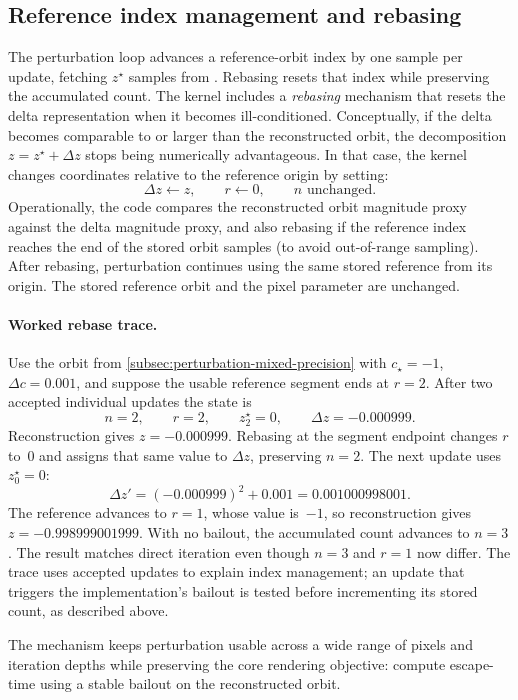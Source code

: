 \subsection{Reference index management and rebasing}
\label{sec:perturb-only-rebase}

The perturbation loop advances a reference-orbit index  by
one sample per update, fetching \(z^\star\) samples from . Rebasing
resets that index while preserving the accumulated  count. The
kernel includes a \emph{rebasing} mechanism that resets the delta
representation when it becomes ill-conditioned. Conceptually, if the delta
becomes comparable to or larger than the reconstructed orbit, the decomposition
\(z = z^\star + \Delta z\) stops being numerically advantageous. In that case,
the kernel changes coordinates relative to the reference origin by setting:
\[
\Delta z \leftarrow z,\qquad r\leftarrow0,\qquad n\text{ unchanged}.
\]
Operationally, the code compares the reconstructed orbit magnitude proxy
against the delta magnitude proxy, and also rebasing if the reference index
reaches the end of the stored orbit samples (to avoid out-of-range sampling).
After rebasing, perturbation continues using the same stored reference from its
origin. The stored reference orbit and the pixel parameter are unchanged.

\paragraph{Worked rebase trace.}
Use the orbit from \cref{subsec:perturbation-mixed-precision} with
$c_\star=-1$, $\Delta c=0.001$, and suppose the usable reference segment ends at
$r=2$. After two accepted individual updates the state is
\[
n=2,\qquad r=2,\qquad z_2^\star=0,\qquad \Delta z=-0.000999.
\]
Reconstruction gives $z=-0.000999$. Rebasing at the segment endpoint changes
$r$ to~0 and assigns that same value to $\Delta z$, preserving $n=2$.
The next update uses $z_0^\star=0$:
\[
\Delta z'=(-0.000999)^2+0.001=0.001000998001.
\]
The reference advances to $r=1$, whose value is~$-1$, so reconstruction gives
$z=-0.998999001999$. With no bailout, the accumulated count advances to $n=3$.
The result matches direct iteration even though $n=3$ and $r=1$ now differ.
The trace uses accepted updates to explain index management; an update that
triggers the implementation's bailout is tested before incrementing its stored
count, as described above.

The mechanism keeps perturbation usable across a wide range of
pixels and iteration depths while preserving the core rendering objective:
compute escape-time using a stable bailout on the reconstructed orbit.

